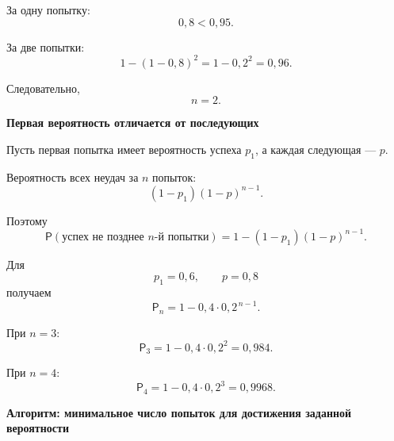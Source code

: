 \documentclass[a4paper,12pt]{article}
\newcommand{\Prob}{\mathsf{P}}
\newcommand{\subtopic}[1]{%
  \vspace{0.4em}
  {\large\bfseries\color{darkaccent}#1\par}
  \vspace{0.15em}
}
\begin{document}
За одну попытку:
\[
0{,}8<0{,}95.
\]

За две попытки:
\[
1-(1-0{,}8)^2
=
1-0{,}2^2
=
0{,}96.
\]

Следовательно,
\[
\boxed{n=2}.
\]

\subtopic{Первая вероятность отличается от последующих}

Пусть первая попытка имеет вероятность успеха $p_1$, а каждая следующая ---
$p$.

Вероятность всех неудач за $n$ попыток:
\[
(1-p_1)(1-p)^{n-1}.
\]

Поэтому
\[
\boxed{
\Prob(\text{успех не позднее }n\text{-й попытки})
=
1-(1-p_1)(1-p)^{n-1}
}.
\]

Для
\[
p_1=0{,}6,
\qquad
p=0{,}8
\]
получаем
\[
\Prob_n
=
1-0{,}4\cdot0{,}2^{\,n-1}.
\]

При $n=3$:
\[
\Prob_3
=
1-0{,}4\cdot0{,}2^2
=
0{,}984.
\]

При $n=4$:
\[
\Prob_4
=
1-0{,}4\cdot0{,}2^3
=
0{,}9968.
\]


\clearpage
\thispagestyle{fancy}

\begin{center}
{\Large\bfseries\color{darkaccent}
Алгоритм: минимальное число попыток для достижения заданной вероятности}
\end{center}

\vspace{10mm}
\end{document}
